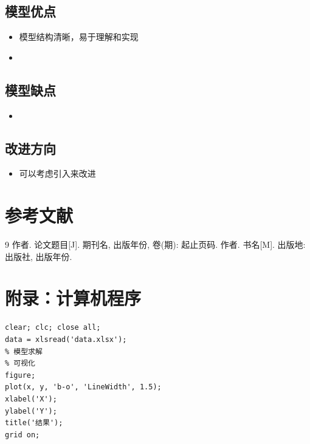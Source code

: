 \documentclass[12pt,a4paper]{article}
\begin{document}
\subsection{模型优点}
\begin{itemize}
  \item 模型结构清晰，易于理解和实现
  \item \underline{\hspace{8cm}}
\end{itemize}

\subsection{模型缺点}
\begin{itemize}
  \item \underline{\hspace{8cm}}
\end{itemize}

\subsection{改进方向}
\begin{itemize}
  \item 可以考虑引入\underline{\hspace{4cm}}来改进
\end{itemize}

\section{参考文献}

\begin{thebibliography}{9}
   作者. 论文题目[J]. 期刊名, 出版年份, 卷(期): 起止页码.
   作者. 书名[M]. 出版地: 出版社, 出版年份.
\end{thebibliography}

\newpage
\appendix
\section{附录：计算机程序}


\begin{lstlisting}[caption=主程序]
% 数学建模竞赛主程序
clear; clc; close all;
data = xlsread('data.xlsx');
% 模型求解
% 可视化
figure;
plot(x, y, 'b-o', 'LineWidth', 1.5);
xlabel('X');
ylabel('Y');
title('结果');
grid on;
\end{lstlisting}
\end{document}
